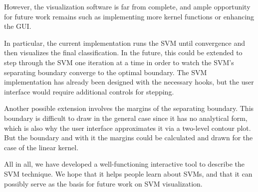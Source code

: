 \documentclass[parskip=half]{scrartcl}
\begin{document}
However, the visualization software is far from complete,
and ample opportunity for future work remains
such as implementing more kernel functions or enhancing the GUI.

In particular, the current implementation runs the SVM until convergence
and then visualizes the final classification.
In the future, this could be extended
to step through the SVM one iteration at a time
in order to watch the SVM's separating boundary converge to the optimal boundary.
The SVM implementation has already been designed with the necessary hooks,
but the user interface would require additional controls for stepping.

Another possible extension involves the margins of the separating boundary.
This boundary is difficult to draw in the general case since it has no analytical form,
which is also why the user interface approximates it via a two-level contour plot.
But the boundary and with it the margins could be calculated and drawn
for the case of the linear kernel.

All in all, we have developed a well-functioning interactive tool to describe the SVM technique.
We hope that it helps people learn about SVMs,
and that it can possibly serve as the basis for future work on SVM visualization.
\end{document}
